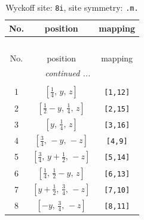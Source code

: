 \documentclass[fleqn,8pt]{jsarticle}
\begin{document}
\begin{longtable}{ccc}
\caption{Wyckoff site: {\tt 8i}, site symmetry: {\tt .m.}}
 \\
 \hline \hline
No. & position & mapping \\ \hline \endfirsthead

\multicolumn{2}{l}{\tablename\ \thetable{}} \\
 \hline \hline
No. & position & mapping \\ \hline \endhead

 \hline \hline
\multicolumn{2}{r}{\footnotesize\it continued ...} \\ \endfoot

 \hline \hline
\multicolumn{2}{r}{} \\ \endlastfoot

1 & $\left[ \frac{1}{4},\, y,\, z \right]$ & {\tt [1,12]} \\ \hline
2 & $\left[ \frac{1}{2} - y,\, \frac{1}{4},\, z \right]$ & {\tt [2,15]} \\ \hline
3 & $\left[ y,\, \frac{1}{4},\, z \right]$ & {\tt [3,16]} \\ \hline
4 & $\left[ \frac{3}{4},\, - y,\, - z \right]$ & {\tt [4,9]} \\ \hline
5 & $\left[ \frac{3}{4},\, y + \frac{1}{2},\, - z \right]$ & {\tt [5,14]} \\ \hline
6 & $\left[ \frac{1}{4},\, \frac{1}{2} - y,\, z \right]$ & {\tt [6,13]} \\ \hline
7 & $\left[ y + \frac{1}{2},\, \frac{3}{4},\, - z \right]$ & {\tt [7,10]} \\ \hline
8 & $\left[ - y,\, \frac{3}{4},\, - z \right]$ & {\tt [8,11]} \\
\end{longtable}
\renewcommand{\arraystretch}{1.2}
\end{document}
